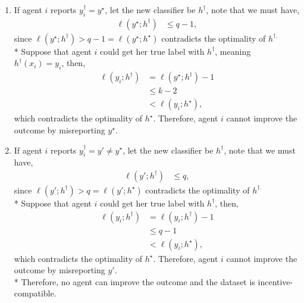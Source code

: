 \documentclass{article}
\begin{document}
\begin{enumerate}
\item If agent $i $ reports $y^{\dagger}_{i} = y^\star $, let the new classifier be $h^{\dagger}$, note that we must have,
\begin{align*}
\ell\left(y^\star  ; h^{\dagger}\right) &\leq  q - 1,
\end{align*}
since $\ell\left(y^\star  ; h^{\dagger}\right) > q - 1 = \ell\left(y^\star  ; h^\star \right)$ contradicts the optimality of $h^{\dagger.}$
\\* Suppose that agent $i $ could get her true label with $h^{\dagger}$, meaning $h^{\dagger}\left(x_{i}\right) = y_{i}$, then,
\begin{align*}
\ell\left(y_{i} ; h^{\dagger}\right) &= \ell\left(y^\star  ; h^{\dagger}\right) - 1
\\ &\leq  k - 2
\\ &< \ell\left(y_{i} ; h^\star \right),
\end{align*}
which contradicts the optimality of $h^\star $. Therefore, agent $i $ cannot improve the outcome by misreporting $y^\star $.
\item If agent $i $ reports $y^{\dagger}_{i} = y' \neq  y^\star $, let the new classifier be $h^{\dagger}$, note that we must have,
\begin{align*}
\ell\left(y' ; h^{\dagger}\right) &\leq  q,
\end{align*}
since $\ell\left(y' ; h^{\dagger}\right) > q = \ell\left(y' ; h^\star \right)$ contradicts the optimality of $h^{\dagger.}$
\\* Suppose that agent $i $ could get her true label with $h^{\dagger}$, then,
\begin{align*}
\ell\left(y_{i} ; h^{\dagger}\right) &= \ell\left(y_{i} ; h^{\dagger}\right) - 1
\\ &\leq  q - 1
\\ &< \ell\left(y_{i} ; h^\star \right),
\end{align*}
which contradicts the optimality of $h^\star $. Therefore, agent $i $ cannot improve the outcome by misreporting $y'$.
\\* Therefore, no agent can improve the outcome and the dataset is incentive-compatible.
\newline \newline
\end{enumerate}
\end{document}
